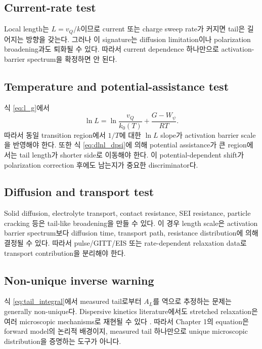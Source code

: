 \documentclass[11pt]{article}
\begin{document}
\subsection{Current-rate test}\label{subsec:current_test}

Local length는 \(L=v_Q/k\)이므로 current 또는 charge sweep rate가 커지면 tail은 길어지는 방향을
갖는다. 그러나 이 signature는 diffusion limitation이나 polarization broadening과도 퇴화될 수 있다.
따라서 current dependence 하나만으로 activation-barrier spectrum을 확정하면 안 된다.

\subsection{Temperature and potential-assistance test}\label{subsec:arrhenius_test}

식 \eqref{eq:l_g}에서
\begin{equation}
\ln L
=
\ln\frac{v_Q}{k_0(T)}
+
\frac{G-W_\psi}{RT}.
\label{eq:ln_l}
\end{equation}
따라서 동일 transition region에서 \(1/T\)에 대한 \(\ln L\) slope가 activation barrier scale을
반영해야 한다. 또한 식 \eqref{eq:dlnl_dpsi}에 의해 potential assistance가 큰 region에서는
tail length가 shorter side로 이동해야 한다. 이 potential-dependent shift가 polarization correction 후에도
남는지가 중요한 discriminator다.

\subsection{Diffusion and transport test}\label{subsec:transport_test}

Solid diffusion, electrolyte transport, contact resistance, SEI resistance, particle cracking 등은
tail-like broadening을 만들 수 있다. 이 경우 length scale은 activation barrier spectrum보다
diffusion time, transport path, resistance distribution에 의해 결정될 수 있다. 따라서 pulse/GITT/EIS
또는 rate-dependent relaxation data로 transport contribution을 분리해야 한다.

\subsection{Non-unique inverse warning}\label{subsec:non_unique}

식 \eqref{eq:tail_integral}에서 measured tail로부터 \(A_L\)를 역으로 추정하는 문제는 generally
non-unique다. Dispersive kinetics literature에서도 stretched relaxation은 여러 microscopic
mechanisms로 재현될 수 있다 \cite{plonka2001}. 따라서 Chapter 1의 equation은 forward model의
논리적 배경이지, measured tail 하나만으로 unique microscopic distribution을 증명하는 도구가 아니다.
\end{document}
